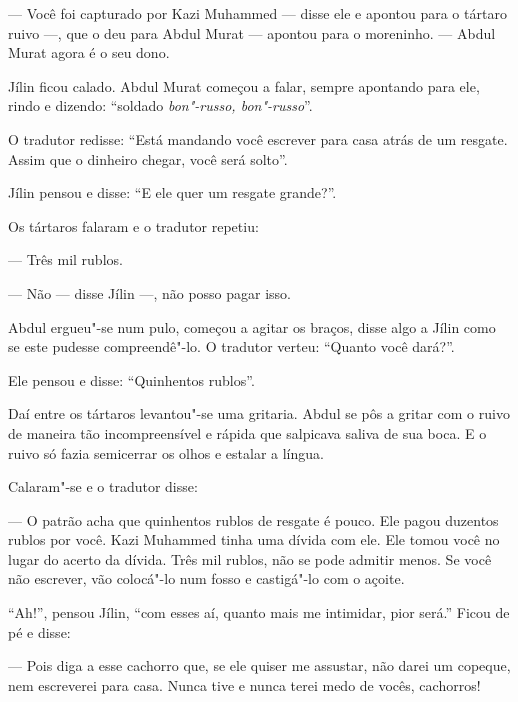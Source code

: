 
--- Você foi capturado por Kazi Muhammed --- disse ele e apontou para o
tártaro ruivo ---, que o deu para Abdul Murat --- apontou para o
moreninho. --- Abdul Murat agora é o seu dono.

Jílin ficou calado. Abdul Murat começou a falar, sempre apontando para ele, rindo e dizendo: ``soldado \emph{bon"-russo, bon"-russo}''.

O tradutor redisse: ``Está mandando você escrever para casa atrás de um
resgate. Assim que o dinheiro chegar, você será solto''.

Jílin pensou e disse: ``E ele quer um resgate grande?''.

Os tártaros falaram e o tradutor repetiu:

--- Três mil rublos.

--- Não --- disse Jílin ---, não posso pagar isso.

Abdul ergueu"-se num pulo, começou a agitar os braços, disse algo a Jílin
como se este pudesse compreendê"-lo. O tradutor verteu: ``Quanto você
dará?''.

Ele pensou e disse: ``Quinhentos rublos''.

Daí entre os tártaros levantou"-se uma gritaria. Abdul se pôs a gritar com
o ruivo de maneira tão incompreensível e rápida que salpicava saliva de
sua boca. E o ruivo só fazia semicerrar os olhos e estalar a língua.

Calaram"-se e o tradutor disse:

--- O patrão acha que quinhentos rublos de resgate é pouco. Ele pagou
duzentos rublos por você. Kazi Muhammed tinha uma dívida com ele. Ele
tomou você no lugar do acerto da dívida. Três mil rublos, não se pode
admitir menos. Se você não escrever, vão colocá"-lo num fosso e
castigá"-lo com o açoite.

``Ah!'', pensou Jílin, ``com esses aí, quanto mais me intimidar, pior
será.'' Ficou de pé e disse:

--- Pois diga a esse cachorro que, se ele quiser me assustar, não darei
um copeque, nem escreverei para casa. Nunca tive e nunca terei medo de
vocês, cachorros!

